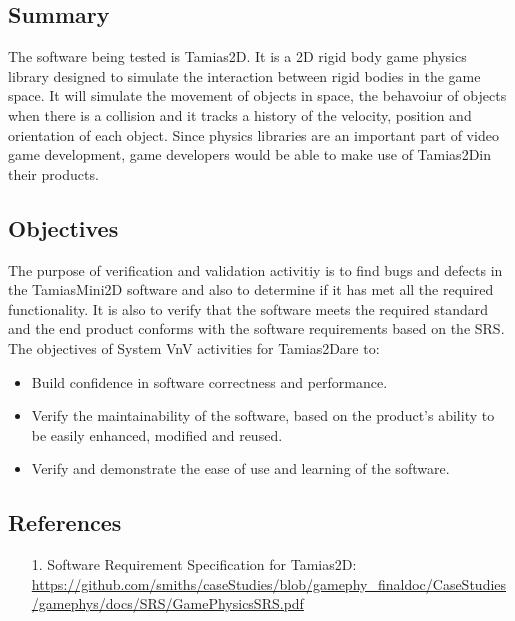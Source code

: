 \documentclass[12pt, titlepage]{article}
\newcommand{\progname}{Tamias2D}
\begin{document}
\subsection{Summary}
The software being tested is \progname. It is a 2D rigid body game physics library designed to simulate the interaction between rigid bodies in the game space. It will simulate the movement of objects in space, the behavoiur of objects when there is a collision and it tracks a history of the velocity, position and orientation of each object. Since physics libraries are an important part of video game development, game developers would be able to make use of \progname in their products. 

\subsection{Objectives}

The purpose of verification and validation activitiy is to find bugs and defects in the TamiasMini2D software and also to determine if it has met all the required functionality. It is also to verify that the software meets the required standard and the end product conforms with the software requirements based on the SRS. The objectives of System VnV activities for \progname are to:
  \begin{itemize}
	\item Build confidence in software correctness and performance.
	\item Verify the maintainability of the software, based on the product's ability to be easily enhanced, modified
	  and reused.
	\item Verify and demonstrate the ease of use and learning of the software.
  \end{itemize}
	


\subsection{References}

\begin{itemize}
	\item[1.] Software Requirement Specification for \progname : \url {https://github.com/smiths/caseStudies/blob/gamephy_finaldoc/CaseStudies/gamephys/docs/SRS/GamePhysicsSRS.pdf}
\end{itemize}
\end{document}
